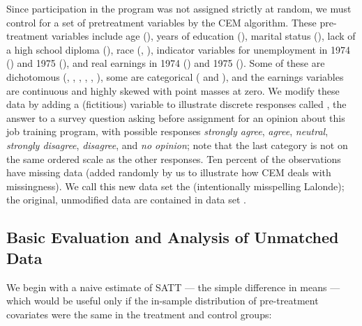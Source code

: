 \documentclass[article]{jss}
\begin{document}
Since participation in the program was not assigned strictly at
random, we must control for a set of pretreatment variables by the CEM
algorithm.  These pre-treatment variables include age (),
years of education (), marital status
(), lack of a high school diploma (),
race (, ), indicator variables for
unemployment in 1974 () and 1975 (), and real
earnings in 1974 () and 1975 ().  Some of these
are dichotomous (, , ,
, , ), some are categorical
( and ), and the earnings variables are
continuous and highly skewed with point masses at zero.  We modify
these data by adding a (fictitious) variable to illustrate discrete
responses called , the answer to a survey question asking
before assignment for an opinion about this job training program, with
possible responses {\it strongly agree}, {\it agree}, {\it neutral},
{\it strongly disagree}, {\it disagree}, and {\it no opinion}; note
that the last category is not on the same ordered scale as the other
responses.  Ten percent of the observations have missing data (added
randomly by us to illustrate how CEM deals with missingness).  We call
this new data set the  (intentionally misspelling
Lalonde); the original, unmodified \citet{Lalonde86} data are
contained in data set .

\subsection{Basic Evaluation and Analysis of Unmatched Data}\label{s:basic}

We begin with a naive estimate of SATT --- the simple difference in
means --- which would be useful only if the in-sample distribution of
pre-treatment covariates were the same in the treatment and control
groups:
\end{document}

